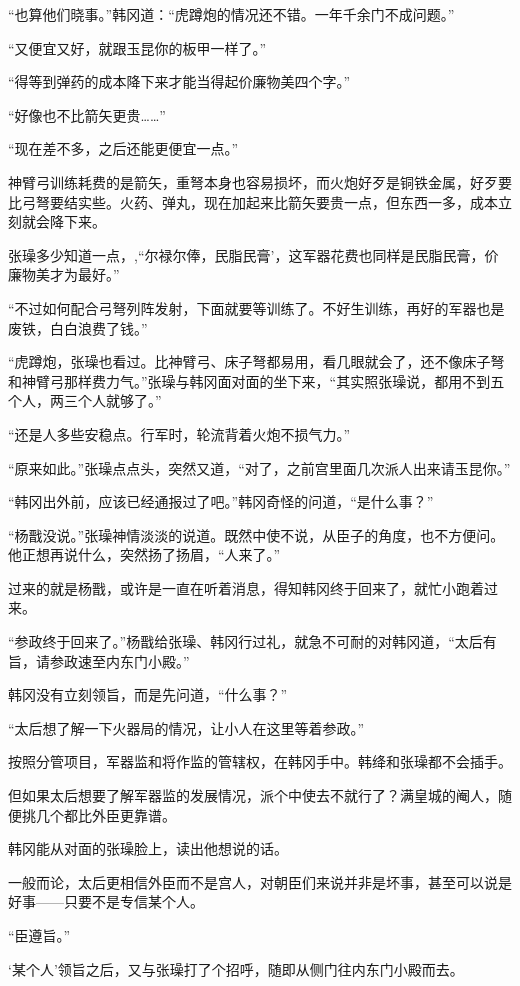 “也算他们晓事。”韩冈道：“虎蹲炮的情况还不错。一年千余门不成问题。”

“又便宜又好，就跟玉昆你的板甲一样了。”

“得等到弹药的成本降下来才能当得起价廉物美四个字。”

“好像也不比箭矢更贵……”

“现在差不多，之后还能更便宜一点。”

神臂弓训练耗费的是箭矢，重弩本身也容易损坏，而火炮好歹是铜铁金属，好歹要比弓弩要结实些。火药、弹丸，现在加起来比箭矢要贵一点，但东西一多，成本立刻就会降下来。

张璪多少知道一点，,“尔禄尔俸，民脂民膏’，这军器花费也同样是民脂民膏，价廉物美才为最好。”

“不过如何配合弓弩列阵发射，下面就要等训练了。不好生训练，再好的军器也是废铁，白白浪费了钱。”

“虎蹲炮，张璪也看过。比神臂弓、床子弩都易用，看几眼就会了，还不像床子弩和神臂弓那样费力气。”张璪与韩冈面对面的坐下来，“其实照张璪说，都用不到五个人，两三个人就够了。”

“还是人多些安稳点。行军时，轮流背着火炮不损气力。”

“原来如此。”张璪点点头，突然又道，“对了，之前宫里面几次派人出来请玉昆你。”

“韩冈出外前，应该已经通报过了吧。”韩冈奇怪的问道，“是什么事？”

“杨戬没说。”张璪神情淡淡的说道。既然中使不说，从臣子的角度，也不方便问。他正想再说什么，突然扬了扬眉，“人来了。”

过来的就是杨戬，或许是一直在听着消息，得知韩冈终于回来了，就忙小跑着过来。

“参政终于回来了。”杨戬给张璪、韩冈行过礼，就急不可耐的对韩冈道，“太后有旨，请参政速至内东门小殿。”

韩冈没有立刻领旨，而是先问道，“什么事？”

“太后想了解一下火器局的情况，让小人在这里等着参政。”

按照分管项目，军器监和将作监的管辖权，在韩冈手中。韩绛和张璪都不会插手。

但如果太后想要了解军器监的发展情况，派个中使去不就行了？满皇城的阉人，随便挑几个都比外臣更靠谱。

韩冈能从对面的张璪脸上，读出他想说的话。

一般而论，太后更相信外臣而不是宫人，对朝臣们来说并非是坏事，甚至可以说是好事——只要不是专信某个人。

“臣遵旨。”

‘某个人’领旨之后，又与张璪打了个招呼，随即从侧门往内东门小殿而去。

